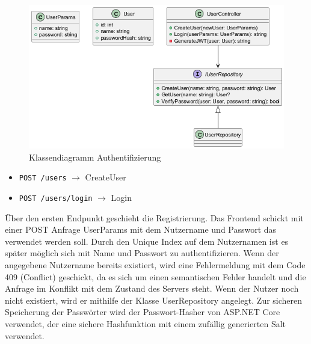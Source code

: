 \begin{figure}[htb]
    \includegraphics[width=\linewidth]{images/diagrams/auth.png}
    \caption{Klassendiagramm Authentifizierung}
    \label{fig:cd_auth}
\end{figure}

\begin{itemize}
    \item \lstinline{POST /users} $\rightarrow$ CreateUser
    \item \lstinline{POST /users/login} $\rightarrow$ Login
\end{itemize}

Über den ersten Endpunkt geschieht die Registrierung. Das Frontend schickt mit einer POST Anfrage UserParams mit dem Nutzername und Passwort das verwendet werden soll. Durch den Unique Index auf dem Nutzernamen ist es später möglich sich mit Name und Passwort zu authentifizieren.
Wenn der angegebene Nutzername bereits existiert, wird eine Fehlermeldung mit dem Code 409 (Conflict) geschickt, da es sich um einen semantischen Fehler handelt und die Anfrage im Konflikt mit dem Zustand des Servers steht. %
Wenn der Nutzer noch nicht existiert, wird er mithilfe der Klasse UserRepository angelegt.
Zur sicheren Speicherung der Passwörter wird der Passwort-Hasher von ASP.NET Core verwendet, der eine sichere Hashfunktion mit einem zufällig generierten Salt verwendet.

